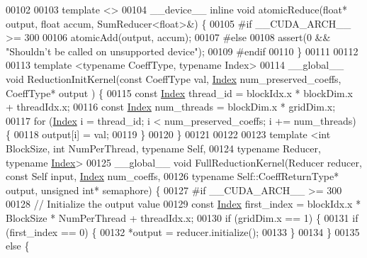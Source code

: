 \begin{DoxyCode}
00102 
00103 \textcolor{keyword}{template} <>
00104 \_\_device\_\_ \textcolor{keyword}{inline} \textcolor{keywordtype}{void} atomicReduce(\textcolor{keywordtype}{float}* output, \textcolor{keywordtype}{float} accum, SumReducer<float>&) \{
00105 \textcolor{preprocessor}{#if \_\_CUDA\_ARCH\_\_ >= 300}
00106   atomicAdd(output, accum);
00107 \textcolor{preprocessor}{#else}
00108   assert(0 && \textcolor{stringliteral}{"Shouldn't be called on unsupported device"});
00109 \textcolor{preprocessor}{#endif}
00110 \}
00111 
00112 
00113 \textcolor{keyword}{template} <\textcolor{keyword}{typename} CoeffType, \textcolor{keyword}{typename} Index>
00114 \_\_global\_\_ \textcolor{keywordtype}{void} ReductionInitKernel(\textcolor{keyword}{const} CoeffType val, \hyperlink{namespace_eigen_a62e77e0933482dafde8fe197d9a2cfde}{Index} num\_preserved\_coeffs, CoeffType* output
      ) \{
00115   \textcolor{keyword}{const} \hyperlink{namespace_eigen_a62e77e0933482dafde8fe197d9a2cfde}{Index} thread\_id = blockIdx.x * blockDim.x + threadIdx.x;
00116   \textcolor{keyword}{const} \hyperlink{namespace_eigen_a62e77e0933482dafde8fe197d9a2cfde}{Index} num\_threads = blockDim.x * gridDim.x;
00117   \textcolor{keywordflow}{for} (\hyperlink{namespace_eigen_a62e77e0933482dafde8fe197d9a2cfde}{Index} i = thread\_id; i < num\_preserved\_coeffs; i += num\_threads) \{
00118     output[i] = val;
00119   \}
00120 \}
00121 
00122 
00123 \textcolor{keyword}{template} <\textcolor{keywordtype}{int} BlockSize, \textcolor{keywordtype}{int} NumPerThread, \textcolor{keyword}{typename} Self,
00124           \textcolor{keyword}{typename} Reducer, \textcolor{keyword}{typename} \hyperlink{namespace_eigen_a62e77e0933482dafde8fe197d9a2cfde}{Index}>
00125 \_\_global\_\_ \textcolor{keywordtype}{void} FullReductionKernel(Reducer reducer, \textcolor{keyword}{const} Self input, \hyperlink{namespace_eigen_a62e77e0933482dafde8fe197d9a2cfde}{Index} num\_coeffs,
00126                                     \textcolor{keyword}{typename} Self::CoeffReturnType* output, \textcolor{keywordtype}{unsigned} \textcolor{keywordtype}{int}* semaphore) \{
00127 \textcolor{preprocessor}{#if \_\_CUDA\_ARCH\_\_ >= 300}
00128   \textcolor{comment}{// Initialize the output value}
00129   \textcolor{keyword}{const} \hyperlink{namespace_eigen_a62e77e0933482dafde8fe197d9a2cfde}{Index} first\_index = blockIdx.x * BlockSize * NumPerThread + threadIdx.x;
00130   \textcolor{keywordflow}{if} (gridDim.x == 1) \{
00131     \textcolor{keywordflow}{if} (first\_index == 0) \{
00132       *output = reducer.initialize();
00133     \}
00134   \}
00135   \textcolor{keywordflow}{else} \{

\end{DoxyCode}
